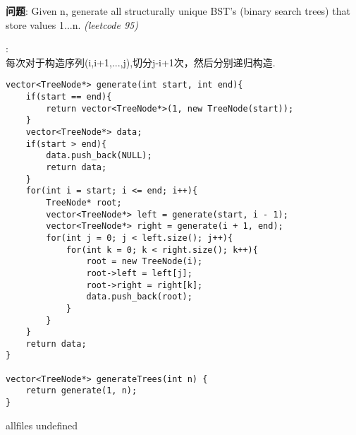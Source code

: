 \documentclass{article}
\begin{document}
\begin{CJK}{UTF8}{gbsn}     %

\else
    
\begin{description}
    \item{\textbf{问题}}: Given n, generate all structurally unique BST's (binary search trees) that store values 1...n. \textit{(leetcode 95)}
    \item{\textbf{}} : 
    \\每次对于构造序列(i,i+1,...,j),切分j-i+1次，然后分别递归构造.
    \begin{lstlisting}
vector<TreeNode*> generate(int start, int end){
    if(start == end){
        return vector<TreeNode*>(1, new TreeNode(start));
    }
    vector<TreeNode*> data;
    if(start > end){
        data.push_back(NULL);
        return data;
    }
    for(int i = start; i <= end; i++){
        TreeNode* root;
        vector<TreeNode*> left = generate(start, i - 1);
        vector<TreeNode*> right = generate(i + 1, end);
        for(int j = 0; j < left.size(); j++){
            for(int k = 0; k < right.size(); k++){
                root = new TreeNode(i);
                root->left = left[j];
                root->right = right[k];
                data.push_back(root);
            }
        }
    }
    return data;
}

vector<TreeNode*> generateTrees(int n) {
    return generate(1, n);
}
    \end{lstlisting}
\end{description}

\fi

\ifx allfiles undefined
\end{CJK}
\end{document}

